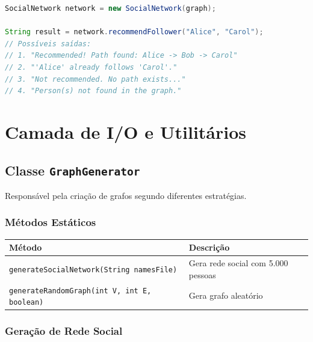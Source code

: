 \documentclass[12pt,a4paper]{article}
\begin{document}
    \begin{lstlisting}[language=Java, caption=Sistema de Recomendação de Seguidores]
SocialNetwork network = new SocialNetwork(graph);

String result = network.recommendFollower("Alice", "Carol");
// Possíveis saídas:
// 1. "Recommended! Path found: Alice -> Bob -> Carol"
// 2. "'Alice' already follows 'Carol'."
// 3. "Not recommended. No path exists..."
// 4. "Person(s) not found in the graph."
    \end{lstlisting}

    \newpage

    \section{Camada de I/O e Utilitários}

    \subsection{Classe \texttt{GraphGenerator}}

    Responsável pela criação de grafos segundo diferentes estratégias.

    \subsubsection{Métodos Estáticos}

    \begin{table}[h]
        \centering
        \begin{tabular}{|l|l|}
            \hline
            \textbf{Método} & \textbf{Descrição} \\
            \hline
            \texttt{generateSocialNetwork(String namesFile)} & Gera rede social com 5.000 pessoas \\
            \hline
            \texttt{generateRandomGraph(int V, int E, boolean)} & Gera grafo aleatório \\
            \hline
        \end{tabular}
    \end{table}

    \subsubsection{Geração de Rede Social}
\end{document}
